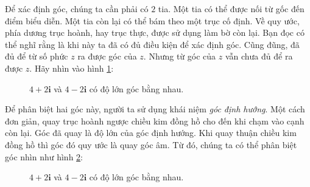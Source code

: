 \documentclass[a4paper, titlepage, openany]{book}
\begin{document}
Để xác định góc, chúng ta cần phải có $2$ tia. Một tia có thể được nối từ gốc đến điểm biểu diễn. Một tia còn lại có thể bám theo một trục cố định. Về quy ước, phía dương trục hoành, hay trục thực, được sử dụng làm bờ còn lại. Bạn đọc có thể nghĩ rằng là khi này ta đã có đủ điều kiện để xác định góc. Cũng đũng, đã đủ để từ số phức $z$ ra được góc của $z$. Nhưng từ góc của $z$ vẫn chưa đủ để ra được $z$. Hãy nhìn vào hình \ref{fig:hai_truong_hop_goc}:
\begin{figure}[h]
   \centering
   \caption{$4+2\mathbf{i}$ và $4-2\mathbf{i}$ có độ lớn góc bằng nhau.}
   \label{fig:hai_truong_hop_goc}
\end{figure}


Để phân biệt hai góc này, người ta sử dụng khái niệm \emph{góc định hướng}. Một cách đơn giản, quay trục hoành ngược chiều kim đồng hồ cho đến khi chạm vào cạnh còn lại. Góc đã quay là độ lớn của góc định hướng. Khi quay thuận chiều kim đồng hồ thì góc đó quy ước là quay góc âm. Từ đó, chúng ta có thể phân biệt góc nhìn như hình \ref{fig:hai_truong_hop_goc_dinh_huong}:

\begin{figure}[h]
   \centering
   \caption{$4+2\mathbf{i}$ và $4-2\mathbf{i}$ có độ lớn góc bằng nhau.}
   \label{fig:hai_truong_hop_goc_dinh_huong}
\end{figure}
\end{document}

